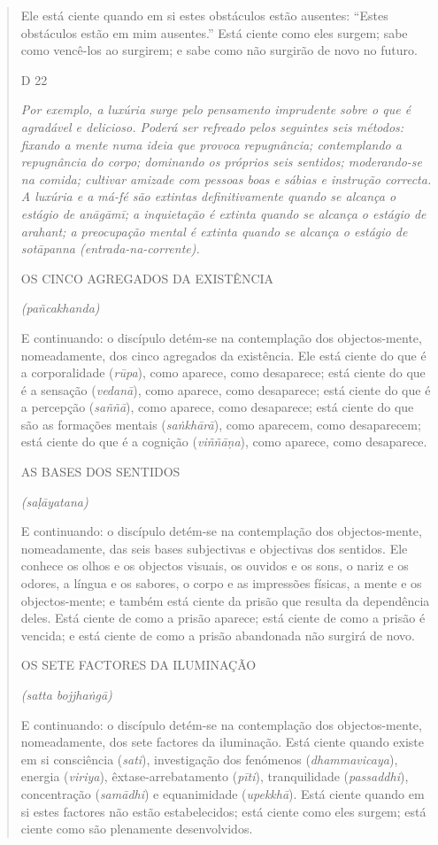 \begin{quote}
Ele está ciente quando em si estes obstáculos estão ausentes: ``Estes obstáculos estão em mim ausentes.'' Está ciente como eles surgem; sabe como vencê-los ao surgirem; e sabe como não surgirão de novo no futuro.

D 22

\emph{Por exemplo, a luxúria surge pelo pensamento imprudente sobre o que é agradável e delicioso. Poderá ser refreado pelos seguintes seis métodos: fixando a mente numa ideia que provoca repugnância; contemplando a repugnância do corpo; dominando os próprios seis sentidos; moderando-se na comida; cultivar amizade com pessoas boas e sábias e instrução correcta. A luxúria e a má-fé são extintas definitivamente quando se alcança o estágio de anāgāmī; a inquietação é extinta quando se alcança o estágio de arahant; a preocupação mental é extinta quando se alcança o estágio de sotāpanna (entrada-na-corrente).}

OS CINCO AGREGADOS DA EXISTÊNCIA

\emph{(pañcakhanda)}

E continuando: o discípulo detém-se na contemplação dos objectos-mente, nomeadamente, dos cinco agregados da existência. Ele está ciente do que é a corporalidade (\emph{rūpa}), como aparece, como desaparece; está ciente do que é a sensação (\emph{vedanā}), como aparece, como desaparece; está ciente do que é a percepção (\emph{saññā}), como aparece, como desaparece; está ciente do que são as formações mentais (\emph{saṅkhārā}), como aparecem, como desaparecem; está ciente do que é a cognição (\emph{viññāṇa}), como aparece, como desaparece.

AS BASES DOS SENTIDOS

\emph{(saḷāyatana)}

E continuando: o discípulo detém-se na contemplação dos objectos-mente, nomeadamente, das seis bases subjectivas e objectivas dos sentidos. Ele conhece os olhos e os objectos visuais, os ouvidos e os sons, o nariz e os odores, a língua e os sabores, o corpo e as impressões físicas, a mente e os objectos-mente; e também está ciente da prisão que resulta da dependência deles. Está ciente de como a prisão aparece; está ciente de como a prisão é vencida; e está ciente de como a prisão abandonada não surgirá de novo.

OS SETE FACTORES DA ILUMINAÇÃO

\emph{(satta bojjhaṅgā)}

E continuando: o discípulo detém-se na contemplação dos objectos-mente, nomeadamente, dos sete factores da iluminação. Está ciente quando existe em si consciência (\emph{sati}), investigação dos fenómenos (\emph{dhammavicaya}), energia (\emph{viriya}), êxtase-arrebatamento (\emph{pīti}), tranquilidade (\emph{passaddhi}), concentração (\emph{samādhi}) e equanimidade (\emph{upekkhā}). Está ciente quando em si estes factores não estão estabelecidos; está ciente como eles surgem; está ciente como são plenamente desenvolvidos.


\end{quote}
